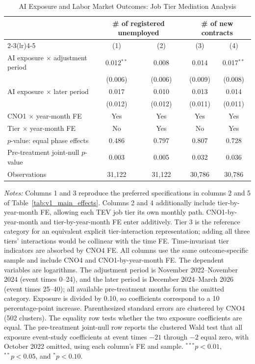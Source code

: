 \begin{table}[H]
\centering
\caption{AI Exposure and Labor Market Outcomes: Job Tier Mediation Analysis}
\label{tab:v1_job_tier_mediation}
\begin{threeparttable}
\scriptsize
\setlength{\tabcolsep}{3.5pt}
\begin{tabular}{lcccc}
\toprule
& \multicolumn{2}{c}{\# of registered unemployed} & \multicolumn{2}{c}{\# of new contracts} \\
\cmidrule(lr){2-3}\cmidrule(lr){4-5}
& (1) & (2) & (3) & (4) \\
\midrule
AI exposure $\times$ adjustment period & 0.012$^{**}$ & 0.008 & 0.014 & 0.017$^{**}$ \\
 & (0.006) & (0.006) & (0.009) & (0.008) \\
AI exposure $\times$ later period & 0.017 & 0.010 & 0.013 & 0.014 \\
 & (0.012) & (0.012) & (0.011) & (0.011) \\
\midrule
CNO1 $\times$ year-month FE & Yes & Yes & Yes & Yes \\
Tier $\times$ year-month FE & No & Yes & No & Yes \\
$p$-value: equal phase effects & 0.486 & 0.797 & 0.807 & 0.728 \\
Pre-treatment joint-null $p$-value & 0.003 & 0.005 & 0.032 & 0.036 \\
Observations & 31,122 & 31,122 & 30,786 & 30,786 \\
\bottomrule
\end{tabular}
\begin{tablenotes}[flushleft]
\footnotesize
\item \emph{Notes:} Columns 1 and 3 reproduce the preferred specifications in columns 2 and 5 of Table~\ref{tab:v1_main_effects}. Columns 2 and 4 additionally include tier-by-year-month FE, allowing each TEV job tier its own monthly path. CNO1-by-year-month and tier-by-year-month FE enter additively. Tier 3 is the reference category for an equivalent explicit tier-interaction representation; adding all three tiers' interactions would be collinear with the time FE. Time-invariant tier indicators are absorbed by CNO4 FE. All columns use the same outcome-specific sample and include CNO4 and CNO1-by-year-month FE. The dependent variables are logarithms. The adjustment period is November 2022--November 2024 (event times 0--24), and the later period is December 2024--March 2026 (event times 25--40); all available pre-treatment months form the omitted category. Exposure is divided by 0.10, so coefficients correspond to a 10 percentage-point increase. Parenthesized standard errors are clustered by CNO4 (502 clusters). The equality row tests whether the two exposure coefficients are equal. The pre-treatment joint-null row reports the clustered Wald test that all exposure event-study coefficients at event times $-21$ through $-2$ equal zero, with October 2022 omitted, using each column's FE and sample. $^{***}p<0.01$, $^{**}p<0.05$, and $^{*}p<0.10$.
\end{tablenotes}
\end{threeparttable}
\end{table}
